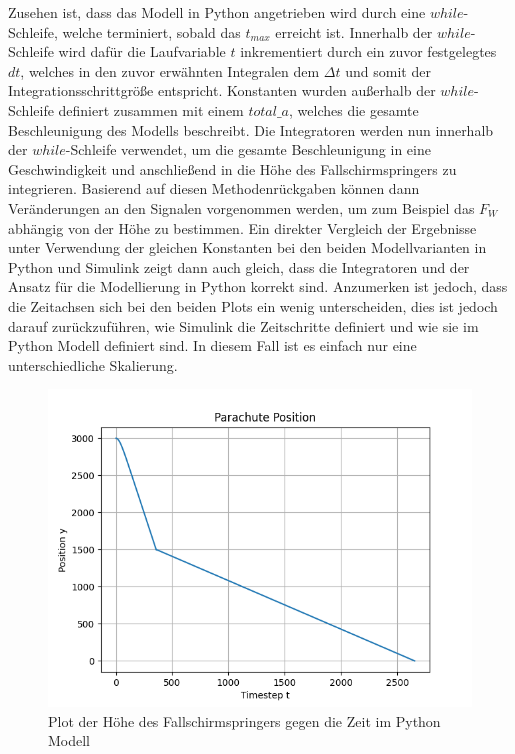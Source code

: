 \documentclass[]{iat}
\begin{document}
Zusehen ist, dass das Modell in Python angetrieben wird durch eine $while$-Schleife, welche terminiert, sobald das $t_{max}$ erreicht ist. Innerhalb der $while$-Schleife wird dafür die Laufvariable $t$ inkrementiert durch ein zuvor festgelegtes $dt$, welches in den zuvor erwähnten Integralen dem $\Delta t$ und somit der Integrationsschrittgröße entspricht. Konstanten wurden außerhalb der $while$-Schleife definiert zusammen mit einem $total\_a$, welches die gesamte Beschleunigung des Modells beschreibt. Die Integratoren werden nun innerhalb der $while$-Schleife verwendet, um die gesamte Beschleunigung in eine Geschwindigkeit und anschließend in die Höhe des Fallschirmspringers zu integrieren. Basierend auf diesen Methodenrückgaben können dann Veränderungen an den Signalen vorgenommen werden, um zum Beispiel das $F_W$ abhängig von der Höhe zu bestimmen. Ein direkter Vergleich der Ergebnisse unter Verwendung der gleichen Konstanten bei den beiden Modellvarianten in Python und Simulink zeigt dann auch gleich, dass die Integratoren und der Ansatz für die Modellierung in Python korrekt sind. Anzumerken ist jedoch, dass die Zeitachsen sich bei den beiden Plots ein wenig unterscheiden, dies ist jedoch darauf zurückzuführen, wie Simulink die Zeitschritte definiert und wie sie im Python Modell definiert sind. In diesem Fall ist es einfach nur eine unterschiedliche Skalierung.
\begin{figure}[H]
    \includegraphics[width=\textwidth]{graphics/python_parachute_s_plot.png}
    \centering
    \caption{Plot der Höhe des Fallschirmspringers gegen die Zeit im Python Modell}
    \label{fig:python_parachute_s_plot}
\end{figure}
\end{document}
